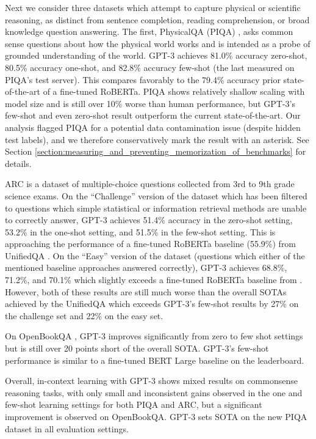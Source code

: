 

Next we consider three datasets which attempt to capture physical or scientific reasoning, as distinct from sentence completion, reading comprehension, or broad knowledge question answering. The first, PhysicalQA (PIQA) \cite{bisk2019piqa}, asks common sense questions about how the physical world works and is intended as a probe of grounded understanding of the world. GPT-3 achieves 81.0\% accuracy zero-shot, 80.5\% accuracy one-shot, and 82.8\% accuracy few-shot (the last measured on PIQA's test server).  This compares favorably to the 79.4\% accuracy prior state-of-the-art of a fine-tuned RoBERTa. PIQA shows relatively shallow scaling with model size and is still over 10\% worse than human performance, but GPT-3's few-shot and even zero-shot result outperform the current state-of-the-art.  Our analysis flagged PIQA for a potential data contamination issue (despite hidden test labels), and we therefore conservatively mark the result with an asterisk. See Section \ref{section:measuring_and_preventing_memorization_of_benchmarks} for details.

ARC \cite{Clark2018ThinkYH} is a dataset of multiple-choice questions collected from 3rd to 9th grade science exams. On the ``Challenge'' version of the dataset which has been filtered to questions which simple statistical or information retrieval methods are unable to  correctly answer, GPT-3 achieves 51.4\% accuracy in the zero-shot setting, 53.2\% in the one-shot setting, and 51.5\% in the few-shot setting. This is approaching the performance of a fine-tuned RoBERTa baseline (55.9\%) from UnifiedQA \cite{khashabi2020unifiedqa}. On the ``Easy'' version of the dataset (questions which either of the mentioned baseline approaches answered correctly), GPT-3 achieves 68.8\%, 71.2\%, and 70.1\% which slightly exceeds a fine-tuned RoBERTa baseline from \cite{khashabi2020unifiedqa}. However, both of these results are still much worse than the overall SOTAs achieved by the UnifiedQA which exceeds GPT-3’s few-shot results by 27\% on the challenge set and 22\% on the easy set.

On OpenBookQA \cite{Mihaylov2018CanAS}, GPT-3 improves significantly from zero to few shot settings but is still over 20 points short of the overall SOTA. GPT-3's few-shot performance is similar to a fine-tuned BERT Large baseline on the leaderboard.

Overall, in-context learning with GPT-3 shows mixed results on commonsense reasoning tasks, with only small and inconsistent gains observed in the one and few-shot learning settings for both PIQA and ARC, but a significant improvement is observed on OpenBookQA. GPT-3 sets SOTA on the new PIQA dataset in all evaluation settings.

